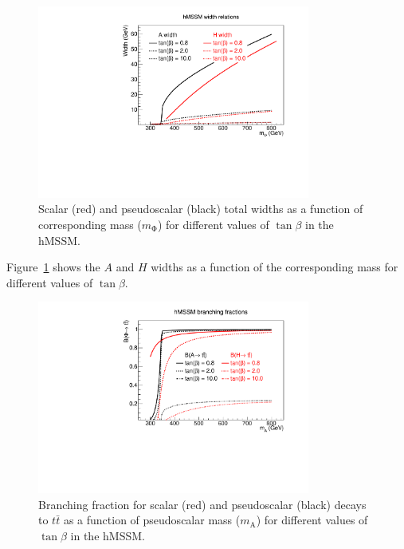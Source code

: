 \begin{figure}[!Hhtb]
\centering
\includegraphics[width=0.8\textwidth,keepaspectratio=true]{fig/chapt8/hmssm/widths_vs_ma.pdf}
\caption{Scalar (red) and pseudoscalar (black) total widths as a function of corresponding mass ($m_\mathrm{\Phi}$) for different values of $\tan\beta$ in the hMSSM.}
\label{fig:hmssm_width_relations}
\end{figure}

Figure~\ref{fig:hmssm_width_relations} shows the $A$ and $H$ widths as a function of the corresponding mass for different values of $\tan\beta$.

\begin{figure}[!Hhtb]
\centering
\includegraphics[width=0.8\textwidth,keepaspectratio=true]{fig/chapt8/hmssm/btt_vs_ma.pdf}
\caption{Branching fraction for scalar (red) and pseudoscalar (black) decays to $t\bar t$ as a function of pseudoscalar mass ($m_\mathrm{A}$) for different values of $\tan\beta$ in the hMSSM.}
\label{fig:hmssm_branching}
\end{figure}

